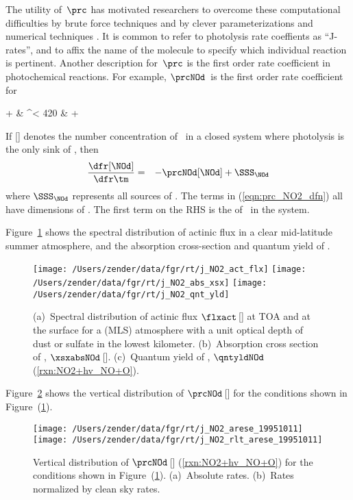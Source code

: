 \documentclass[12pt]{article}
\begin{document}
The utility of~$\prc$ has motivated researchers to overcome these
computational difficulties by brute force techniques and by clever
parameterizations and numerical techniques
\cite[][]{CBI87,DaS91,TMA89,StT901,Pet95,LaC981,WZP00}. 
It is common to refer to photolysis rate coeffients as ``J-rates'',
and to affix the name of the molecule to specify which individual 
reaction is pertinent.
Another description for~$\prc$ is the first order rate coefficient 
in photochemical reactions.
For example, $\prcNOd$~is the first order rate coefficient for 
\begin{rxnarray}
\NOd + \hnu & \yields^{\wvl < 420} & \NO + \Ou
\label{rxn:NO2+hv_NO+O}
\end{rxnarray}
If [\NOd] denotes the number concentration of \NOd\ 
in a closed system where photolysis is the only sink of \NOd, 
then
\begin{eqnarray}
\frac{\dfr[\NOd]}{\dfr\tm} & = & - \prcNOd [\NOd] + \SSS_{\NOd}
\label{eqn:prc_NO2_dfn}
\end{eqnarray}
where $\SSS_{\NOd}$ represents all sources of \NOd.
The terms in (\ref{eqn:prc_NO2_dfn}) all have dimensions of \xmCs.
The first term on the RHS is the \trmdfn{photolysis rate} of \NOd\
in the system. 

Figure~\ref{fgr:j_NO2_spc} shows the spectral distribution of actinic flux
in a clear mid-latitude summer atmosphere, and the absorption
cross-section and quantum yield of \NOd.
\begin{figure*}
\centering
\texttt{[image: /Users/zender/data/fgr/rt/j\_NO2\_act\_flx]}\vfill
\texttt{[image: /Users/zender/data/fgr/rt/j\_NO2\_abs\_xsx]}\vfill
\texttt{[image: /Users/zender/data/fgr/rt/j\_NO2\_qnt\_yld]}\vfill
\caption[Cross Section and Quantum Yield of Nitrogen Dioxide]{
(a)~Spectral distribution of actinic flux $\flxact$\,[\phtxmSsum] at TOA
and at the surface for a \trmidx{mid-latitude summer} (MLS) atmosphere
with a unit optical depth of dust or sulfate in the lowest kilometer.
(b)~Absorption cross section of \NOd, $\xsxabsNOd$\,[\mSxmlc].
(c)~Quantum yield of \NOd, $\qntyldNOd$ (\ref{rxn:NO2+hv_NO+O}).
\label{fgr:j_NO2_spc}}
\end{figure*}

Figure~\ref{fgr:j_NO2} shows the vertical distribution of
$\prcNOd$\,[\xs] for the conditions shown in
Figure~(\ref{fgr:j_NO2_spc}). 
\begin{figure*}
\centering
\texttt{[image: /Users/zender/data/fgr/rt/j\_NO2\_arese\_19951011]}\vfill
\texttt{[image: /Users/zender/data/fgr/rt/j\_NO2\_rlt\_arese\_19951011]}\vfill
\caption[Vertical Distribution of Photodissociation Rates]{
Vertical distribution of $\prcNOd$\,[\xs] (\ref{rxn:NO2+hv_NO+O})
for the conditions shown in Figure~(\ref{fgr:j_NO2_spc}). 
(a)~Absolute rates. 
(b)~Rates normalized by clean sky rates.
\label{fgr:j_NO2}}
\end{figure*}
\end{document}
